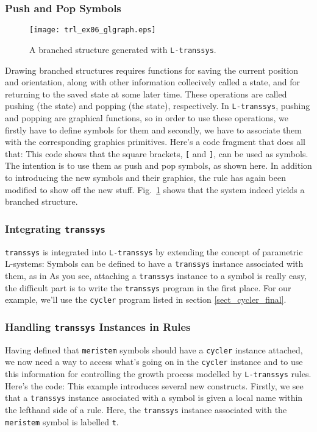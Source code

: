 \documentclass[12pt]{article}
\newcommand{\transsys}{\texttt{transsys}}
\newcommand{\ltranssys}{\texttt{L-}\transsys}
\newcommand{\codeword}[1]{\texttt{#1}}
\begin{document}
\subsubsection{Push and Pop Symbols}

\begin{figure}
\centerline{
  \texttt{[image: trl\_ex06\_glgraph.eps]}
}
\caption{\label{fig_branch}
  A branched structure generated with \ltranssys{}.
}
\end{figure}

Drawing branched structures requires functions for saving the current
position and orientation, along with other information collecively
called a state, and for returning to the saved state at some later
time. These operations are called pushing (the state) and popping (the
state), respectively. In \ltranssys{}, pushing and popping are
graphical functions, so in order to use these operations, we firstly
have to define symbols for them and secondly, we have to associate
them with the corresponding graphics primitives. Here's a code
fragment that does all that:
This code shows that the square brackets, \codeword{[} and
\codeword{]}, can be used as symbols. The intention is to use them as
push and pop symbols, as shown here. In addition to introducing the
new symbols and their graphics, the rule has again been modified to
show off the new stuff. Fig.\ \ref{fig_branch} shows that the system
indeed yields a branched structure.


\subsubsection{Integrating \transsys{}}

\transsys{} is integrated into \ltranssys{} by extending the concept
of parametric L-systems: Symbols can be defined to have a \transsys{}
instance associated with them, as in
As you see, attaching a \transsys{} instance to a symbol is really
easy, the difficult part is to write the \transsys{} program in the
first place. For our example, we'll use the \codeword{cycler} program
listed in section \ref{sect_cycler_final}.


\subsubsection{Handling \transsys{} Instances in Rules}

Having defined that \codeword{meristem} symbols should have a
\codeword{cycler} instance attached, we now need a way to access
what's going on in the \codeword{cycler} instance and to use this
information for controlling the growth process modelled by
\ltranssys{} rules. Here's the code:
This example introduces several new constructs. Firstly, we see that a
\transsys{} instance associated with a symbol is given a local name
within the lefthand side of a rule. Here, the \transsys{} instance
associated with the \codeword{meristem} symbol is labelled
\codeword{t}.
\end{document}

